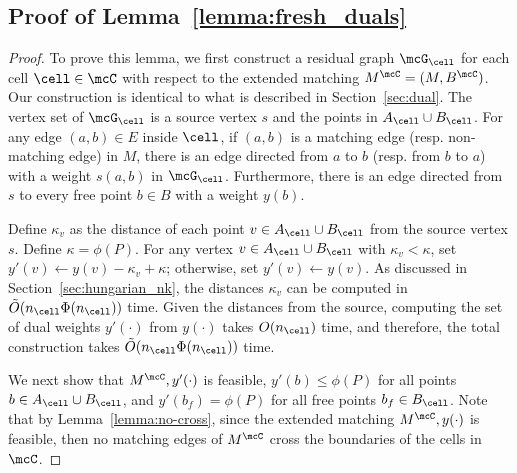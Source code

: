 \subsection{Proof of Lemma~\ref{lemma:fresh_duals}}
%
\updateDuals*
\begin{proof}
    To prove this lemma, we first construct a residual graph $\mcG_\cell$ for each cell $\cell\in\mcC$ with respect to the extended matching $M^\mcC=(M, B^{\mcC})$. Our construction is identical to what is described in Section~\ref{sec:dual}. The vertex set of $\mcG_\cell$ is a source vertex $s$ and the points in $A_\cell\cup B_\cell$. For any edge $(a,b)\in E$ inside $\cell$, if $(a,b)$ is a matching edge (resp. non-matching edge) in $M$, there is an edge directed from $a$ to $b$ (resp. from $b$ to $a$) with a weight $s(a,b)$ in $\mcG_\cell$. Furthermore, there is an edge directed from $s$ to every free point $b\in B$ with a weight $y(b)$. 

    Define $\kappa_v$ as the distance of each point $v\in A_\cell\cup B_\cell$ from the source vertex $s$. Define $\kappa=\phi(P)$. For any vertex $v\in A_\cell\cup B_\cell$ with $\kappa_v<\kappa$, set $y'(v)\leftarrow y(v)-\kappa_v+\kappa$; otherwise, set $y'(v)\leftarrow y(v)$. As discussed in Section~\ref{sec:hungarian_nk}, the distances $\kappa_v$ can be computed in $\tilde{O}(n_\cell\Phi(n_\cell))$ time. Given the distances from the source, computing the set of dual weights $y'(\cdot)$ from $y(\cdot)$ takes $O(n_\cell)$ time, and therefore, the total construction takes $\tilde{O}(n_\cell\Phi(n_\cell))$ time. 
    
    We next show that $M^\mcC, y'(\cdot)$ is feasible, $y'(b)\le \phi(P)$ for all points $b\in A_\cell\cup B_\cell$, and $y'(b_f)=\phi(P)$ for all free points $b_f\in B_\cell$. Note that by Lemma~\ref{lemma:no-cross}, since the extended matching $M^\mcC, y(\cdot)$ is feasible, then no matching edges of $M^\mcC$ cross the boundaries of the cells in $\mcC$.


\end{proof}
